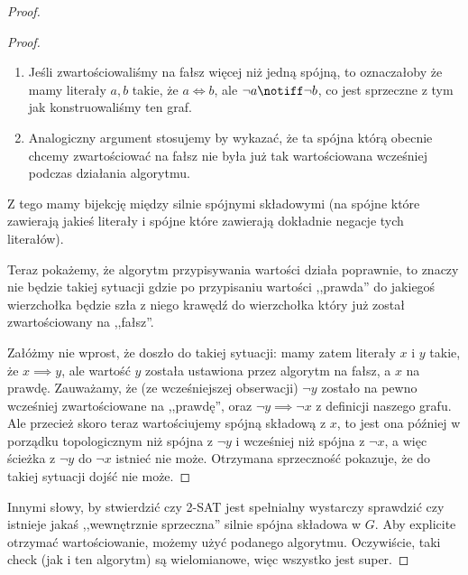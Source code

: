 \begin{proof}
\begin{proof}
		\begin{enumerate}
			\item Jeśli zwartościowaliśmy na fałsz więcej niż jedną spójną, to oznaczałoby że mamy literały \(a, b\) takie, że \(a \iff b\), ale \(\neg a \notiff \neg b\), co jest sprzeczne z tym jak konstruowaliśmy ten graf.
			\item Analogiczny argument stosujemy by wykazać, że ta spójna którą obecnie chcemy zwartościować na fałsz nie była już tak wartościowana wcześniej podczas działania algorytmu.
		\end{enumerate}

		Z tego mamy bijekcję między silnie spójnymi składowymi (na spójne które zawierają jakieś literały i spójne które zawierają dokładnie negacje tych literałów).

		Teraz pokażemy, że algorytm przypisywania wartości działa poprawnie, to znaczy nie będzie takiej sytuacji gdzie po przypisaniu wartości ,,prawda'' do jakiegoś wierzchołka będzie szła z niego krawędź do wierzchołka który już został zwartościowany na ,,fałsz''.

		Załóżmy nie wprost, że doszło do takiej sytuacji: mamy zatem literały \(x\) i \(y\) takie, że \( x \implies y\), ale wartość \(y\) została ustawiona przez algorytm na fałsz, a \(x\) na prawdę. Zauważamy, że (ze wcześniejszej obserwacji) \(\neg y\) zostało na pewno wcześniej zwartościowane na ,,prawdę'', oraz \( \neg y \implies \neg x\) z definicji naszego grafu. Ale przecież skoro teraz wartościujemy spójną składową z \(x\), to jest ona później w porządku topologicznym niż spójna z \( \neg y\) i wcześniej niż spójna z \( \neg x\), a więc ścieżka z \( \neg y\) do \( \neg x\) istnieć nie może. Otrzymana sprzeczność pokazuje, że do takiej sytuacji dojść nie może. \end{proof}

	Innymi słowy, by stwierdzić czy \textsc{2-SAT} jest spełnialny wystarczy sprawdzić czy istnieje jakaś ,,wewnętrznie sprzeczna'' silnie spójna składowa w \(G\). Aby explicite otrzymać wartościowanie, możemy użyć podanego algorytmu. Oczywiście, taki check (jak i ten algorytm) są wielomianowe, więc wszystko jest super.

\end{proof}